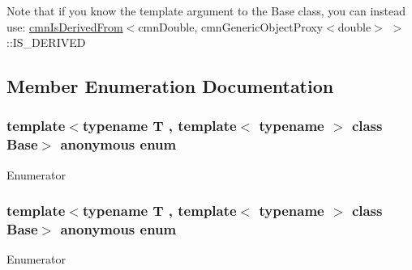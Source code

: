 Note that if you know the template argument to the Base class, you can instead use\+: \hyperlink{classcmn_is_derived_from}{cmn\+Is\+Derived\+From}$<$cmn\+Double, cmn\+Generic\+Object\+Proxy$<$double$>$ $>$\+::\+I\+S\+\_\+\+D\+E\+R\+I\+V\+E\+D 

\subsection{Member Enumeration Documentation}
\hypertarget{classcmn_is_derived_from_templated_adf75555e9b3ea5b7cca26092a9a621bf}{}\subsubsection[{anonymous enum}]{\setlength{\rightskip}{0pt plus 5cm}template$<$typename T , template$<$ typename $>$ class Base$>$ anonymous enum}\label{classcmn_is_derived_from_templated_adf75555e9b3ea5b7cca26092a9a621bf}
\begin{Desc}
\item[Enumerator]\par
\begin{description}
\item[{\em 
\hypertarget{classcmn_is_derived_from_templated_adf75555e9b3ea5b7cca26092a9a621bfa946c9ccdd650ead37b23ab1cb284f2ca}{}I\+S\+\_\+\+D\+E\+R\+I\+V\+E\+D\label{classcmn_is_derived_from_templated_adf75555e9b3ea5b7cca26092a9a621bfa946c9ccdd650ead37b23ab1cb284f2ca}
}]\end{description}
\end{Desc}
\hypertarget{classcmn_is_derived_from_templated_aff833aa4b3d8a186921ab9f2ddb20887}{}\subsubsection[{anonymous enum}]{\setlength{\rightskip}{0pt plus 5cm}template$<$typename T , template$<$ typename $>$ class Base$>$ anonymous enum}\label{classcmn_is_derived_from_templated_aff833aa4b3d8a186921ab9f2ddb20887}
\begin{Desc}
\item[Enumerator]\par
\begin{description}
\item[{\em 
\hypertarget{classcmn_is_derived_from_templated_aff833aa4b3d8a186921ab9f2ddb20887a762073f61bb9b926aba5b4f227f3e6d8}{}I\+S\+\_\+\+N\+O\+T\+\_\+\+D\+E\+R\+I\+V\+E\+D\label{classcmn_is_derived_from_templated_aff833aa4b3d8a186921ab9f2ddb20887a762073f61bb9b926aba5b4f227f3e6d8}
}]\end{description}
\end{Desc}


